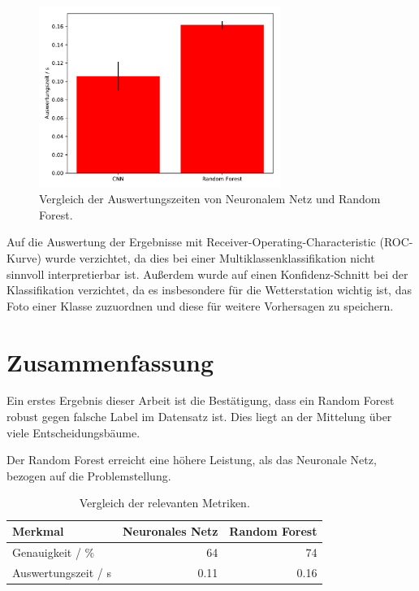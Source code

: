 \begin{figure}
\centering
\includegraphics[width=0.7\textwidth]{content/time.pdf}
\caption{Vergleich der Auswertungszeiten von Neuronalem Netz und Random
Forest.}%
\label{fig:times}
\end{figure}

Auf die Auswertung der Ergebnisse mit Receiver-Operating-Characteristic (ROC-Kurve) wurde
verzichtet, da dies bei einer Multiklassenklassifikation nicht sinnvoll interpretierbar ist.
Außerdem wurde auf einen Konfidenz-Schnitt bei der Klassifikation verzichtet,
da es insbesondere für die Wetterstation wichtig ist, das Foto einer Klasse zuzuordnen und diese
für weitere Vorhersagen zu speichern.

\hypertarget{zusammenfassung}{%
\section{Zusammenfassung}\label{zusammenfassung}}

Ein erstes Ergebnis dieser Arbeit ist die Bestätigung, dass ein Random
Forest robust gegen falsche Label im Datensatz ist. Dies liegt an der
Mittelung über viele Entscheidungsbäume.

Der Random Forest erreicht eine höhere Leistung, als das Neuronale Netz,
bezogen auf die Problemstellung.

\begin{table}
  \centering
  \caption{Vergleich der relevanten Metriken.}%
  \label{tab:fazit}
  \begin{tabular}[]{@{}lrr@{}}
    \toprule
    Merkmal             & Neuronales Netz & Random Forest \\
    \midrule
    Genauigkeit / \%    & 64              & 74            \\
    Auswertungszeit / s & 0.11            & 0.16          \\
    \bottomrule
  \end{tabular}
\end{table}

